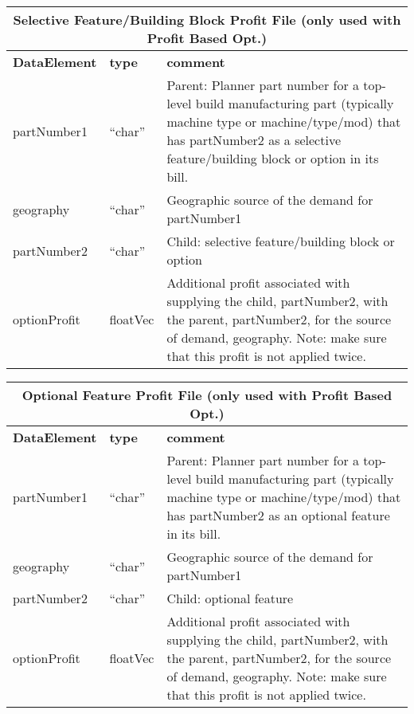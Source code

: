 \begin{tabular}{llp{4in}}
\multicolumn{3}{c}{{\bf Selective Feature/Building Block Profit File 
                            (only used with Profit Based Opt.)}}\\ 
     \hline\hline
{\bf DataElement} &  {\bf type}  &   {\bf comment} \\ \hline
partNumber1 & ``char'' &    Parent: Planner part number for a top-level build manufacturing 
                           part (typically machine type or machine/type/mod) that has 
                           partNumber2 as a selective feature/building block or option
                           in its bill. \\
geography  & ``char'' &   Geographic source of the demand for partNumber1 \\
partNumber2 & ``char'' &    Child: selective feature/building block or option \\
optionProfit  & floatVec &  Additional profit associated with supplying the child, partNumber2,
                           with the parent, partNumber2, for the source of demand, geography.
                           Note: make sure that this profit is not applied twice.
\end{tabular}

\vspace{.5in}

\begin{tabular}{llp{4in}}
\multicolumn{3}{c}{{\bf Optional Feature Profit File 
                            (only used with Profit Based Opt.)}}\\ 
     \hline\hline
{\bf DataElement} &  {\bf type}  &   {\bf comment} \\ \hline
partNumber1 & ``char'' &    Parent: Planner part number for a top-level build manufacturing 
                           part (typically machine type or machine/type/mod) that has 
                           partNumber2 as an optional feature in its bill. \\
geography  & ``char'' &   Geographic source of the demand for partNumber1 \\
partNumber2 & ``char'' &    Child: optional feature \\
optionProfit  & floatVec &  Additional profit associated with supplying the child, partNumber2,
                           with the parent, partNumber2, for the source of demand, geography.
                           Note: make sure that this profit is not applied twice.
\end{tabular}

